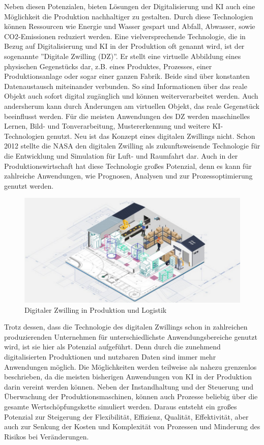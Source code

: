 \documentclass[a4paper,12pt, german]{report}
\begin{document}
Neben diesen Potenzialen, bieten Lösungen der Digitalisierung und KI auch eine Möglichkeit die Produktion nachhaltiger zu gestalten. Durch diese Technologien können Ressourcen wie Energie und Wasser gespart und Abfall, Abwasser, sowie CO2-Emissionen reduziert werden.\cite{36}\newline
Eine vielversprechende Technologie, die in Bezug auf Digitalisierung und KI in der Produktion oft genannt wird, ist der sogenannte ''Digitale Zwilling (DZ)''. Er stellt eine virtuelle Abbildung eines physischen Gegenstücks dar, z.B. eines Produktes, Prozesses, einer Produktionsanlage oder sogar einer ganzen Fabrik. Beide sind über konstanten Datenaustausch miteinander verbunden. So sind Informationen über das reale Objekt auch sofort digital zugänglich und können weiterverarbeitet werden. Auch andersherum kann durch Änderungen am virtuellen Objekt, das reale Gegenstück beeinflusst werden. Für die meisten Anwendungen des DZ werden maschinelles Lernen, Bild- und Tonverarbeitung, Mustererkennung und weitere KI-Technologien genutzt.
Neu ist das Konzept eines digitalen Zwillings nicht. Schon 2012 stellte die NASA den digitalen Zwilling als zukunftsweisende Technologie für die Entwicklung und Simulation für Luft- und Raumfahrt dar. Auch in der Produktionswirtschaft hat diese Technologie großes Potenzial, denn es kann für zahlreiche Anwendungen, wie Prognosen, Analysen und zur Prozessoptimierung genutzt werden.\cite{32}

\begin{figure}[H]
  \center
 \includegraphics[width=12cm]{images/DZ.png}
  \caption[Digitaler Zwilling in Produktion und Logistik]{Digitaler Zwilling in Produktion und Logistik \cite{34}}
\end{figure}

Trotz dessen, dass die Technologie des digitalen Zwillings schon in zahlreichen produzierenden Unternehmen für unterschiedlichste Anwendungsbereiche genutzt wird, ist sie hier als Potenzial aufgeführt. Denn durch die zunehmend digitalisierten Produktionen und nutzbaren Daten sind immer mehr Anwendungen möglich. Die Möglichkeiten werden teilweise als nahezu grenzenlos beschrieben, da die meisten bisherigen Anwendungen von KI in der Produktion darin vereint werden können. Neben der Instandhaltung und der Steuerung und Überwachung der Produktionsmaschinen, können auch Prozesse beliebig über die gesamte Wertschöpfungskette simuliert werden. Daraus entsteht ein großes Potenzial zur Steigerung der Flexibilität, Effizienz, Qualität, Effektivität, aber auch zur Senkung der Kosten und Komplexität von Prozessen und Minderung des Risikos bei Veränderungen.\cite{33}
\end{document}
